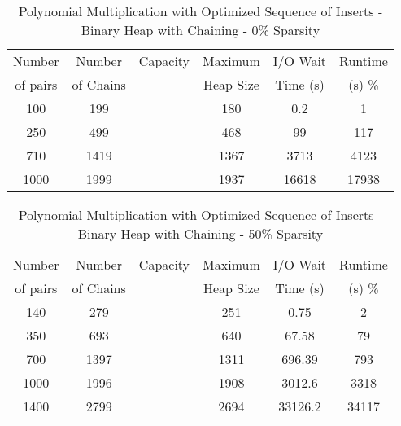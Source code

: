\documentclass[11pt, one-sided]{amsart}
\begin{document}
\begin{table}[htbp]
   \centering
      \caption{Polynomial Multiplication with Optimized Sequence of Inserts - Binary Heap with Chaining - 0\% Sparsity}
   \begin{tabular}{|c|c|c|c|c|c|}
   	\hline
		 Number   & 	Number 	&Capacity		& Maximum	& I/O Wait		& Runtime 	 \\ 
		 of pairs 	&	of Chains	& 			&Heap Size	& Time (s)		&	(s)		 		\%				\\ \hline
		100		&	199		&			&	180		&0.2			& 1			\\
		250		&	499		&			&	468		&99			&117		\\
		710		&	1419		&			&	1367		&3713		& 4123		\\
		1000		&	1999		&			&	1937		&16618		&17938		\\
	\hline
   \end{tabular}
   \label{tab:booktabs}
\end{table}

\begin{table}[htbp]
   \centering
      \caption{Polynomial Multiplication with Optimized Sequence of Inserts - Binary Heap with Chaining - 50\% Sparsity}
   \begin{tabular}{|c|c|c|c|c|c|}
   	\hline
		 Number   & 	Number 	&Capacity		& Maximum	& I/O Wait		& Runtime 	 \\ 
		 of pairs 	&	of Chains	& 			&Heap Size	& Time (s)		&	(s)		 		\%				\\ \hline
		 140		&	279		&			&	251		& 0.75		&	2		\\
		 350		&	693		&			&	640		&67.58		&	79		\\
		 700		&	1397		&			&	1311		&696.39		&	793		\\
		1000		&	1996		&			&	1908		&3012.6		&	3318		\\
		1400		&	2799		&			&	2694		&33126.2		&	34117	\\
	\hline
   \end{tabular}
   \label{tab:booktabs}
\end{table}
\end{document}
